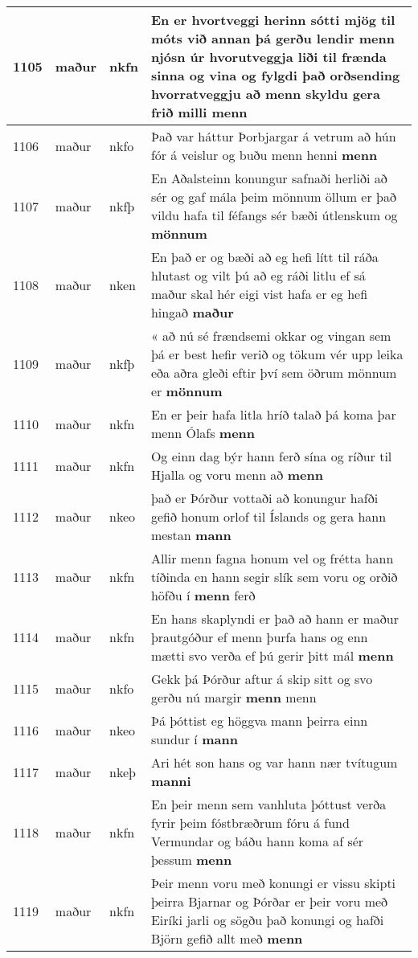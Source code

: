 \documentclass{article}
\begin{document}
\begin{longtable}{p{1cm}|p{1cm}|p{1cm}|p{13cm}}
\hline
1105&maður&nkfn&En er hvortveggi herinn sótti mjög til móts við annan þá gerðu lendir menn njósn úr hvorutveggja liði til frænda sinna og vina og fylgdi það orðsending hvorratveggju að menn skyldu gera frið milli \textbf{menn} \\
\hline
1106&maður&nkfo&Það var háttur Þorbjargar á vetrum að hún fór á veislur og buðu menn henni \textbf{menn} \\
\hline
1107&maður&nkfþ&En Aðalsteinn konungur safnaði herliði að sér og gaf mála þeim mönnum öllum er það vildu hafa til féfangs sér bæði útlenskum og \textbf{mönnum} \\
\hline
1108&maður&nken&En það er og bæði að eg hefi lítt til ráða hlutast og vilt þú að eg ráði litlu ef sá maður skal hér eigi vist hafa er eg hefi hingað \textbf{maður} \\
\hline
1109&maður&nkfþ&« að nú sé frændsemi okkar og vingan sem þá er best hefir verið og tökum vér upp leika eða aðra gleði eftir því sem öðrum mönnum er \textbf{mönnum} \\
\hline
1110&maður&nkfn&En er þeir hafa litla hríð talað þá koma þar menn Ólafs \textbf{menn} \\
\hline
1111&maður&nkfn&Og einn dag býr hann ferð sína og ríður til Hjalla og voru menn að \textbf{menn} \\
\hline
1112&maður&nkeo&það er Þórður vottaði að konungur hafði gefið honum orlof til Íslands og gera hann mestan \textbf{mann} \\
\hline
1113&maður&nkfn&Allir menn fagna honum vel og frétta hann tíðinda en hann segir slík sem voru og orðið höfðu í \textbf{menn} ferð\\
\hline
1114&maður&nkfn&En hans skaplyndi er það að hann er maður þrautgóður ef menn þurfa hans og enn mætti svo verða ef þú gerir þitt mál \textbf{menn} \\
\hline
1115&maður&nkfo&Gekk þá Þórður aftur á skip sitt og svo gerðu nú margir \textbf{menn} menn\\
\hline
1116&maður&nkeo&Þá þóttist eg höggva mann þeirra einn sundur í \textbf{mann} \\
\hline
1117&maður&nkeþ&Ari hét son hans og var hann nær tvítugum \textbf{manni} \\
\hline
1118&maður&nkfn&En þeir menn sem vanhluta þóttust verða fyrir þeim fóstbræðrum fóru á fund Vermundar og báðu hann koma af sér þessum \textbf{menn} \\
\hline
1119&maður&nkfn&Þeir menn voru með konungi er vissu skipti þeirra Bjarnar og Þórðar er þeir voru með Eiríki jarli og sögðu það konungi og hafði Björn gefið allt með \textbf{menn} \\

\end{longtable}
\end{document}
